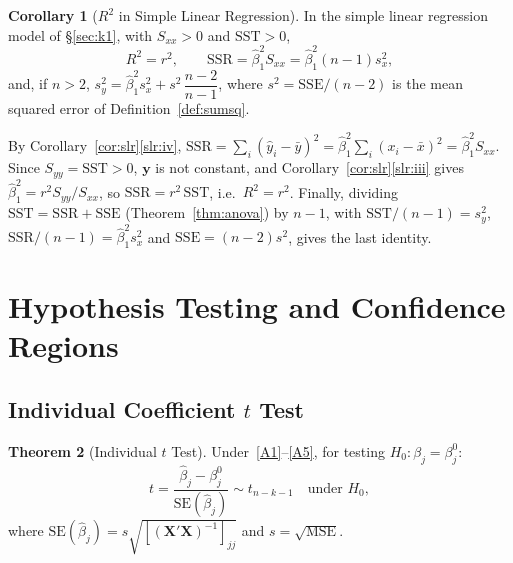 \documentclass[12pt,a4paper]{article}
\makeatletter
\theoremstyle{definition}
\newtheorem{theorem}{Theorem}[section]
\newtheorem{corollary}[theorem]{Corollary}
\renewenvironment{proof}[1][\proofname]{\par
  \pushQED{\qed}%
  \normalfont \topsep6\p@\@plus6\p@\relax
  \trivlist
  \item[\hskip\labelsep\bfseries #1\@addpunct{.}]\ignorespaces
}{%
  \popQED\endtrivlist\@endpefalse
}
\newcommand{\SST}{\mathrm{SST}}
\newcommand{\SSR}{\mathrm{SSR}}
\newcommand{\SSE}{\mathrm{SSE}}
\newcommand{\MSE}{\mathrm{MSE}}
\newcommand{\SE}{\mathrm{SE}}
\newcommand{\bX}{\mathbf{X}}
\newcommand{\by}{\mathbf{y}}
\makeatother
\begin{document}
\begin{corollary}[$R^2$ in Simple Linear Regression]\label{cor:R2-slr}
In the simple linear regression model of \S\ref{sec:k1}, with $S_{xx} > 0$ and $\SST > 0$,
\[
R^2 = r^2, \qquad \SSR = \hat\beta_1^2S_{xx} = \hat\beta_1^2(n-1)s_x^2,
\]
and, if $n > 2$, $s_y^2 = \hat\beta_1^2s_x^2 + s^2\,\dfrac{n-2}{n-1}$, where $s^2 = \SSE/(n-2)$ is the mean squared error of Definition~\ref{def:sumsq}.
\end{corollary}

\begin{proof}
By Corollary~\ref{cor:slr}\ref{slr:iv}, $\SSR = \sum_i(\hat y_i - \bar y)^2 = \hat\beta_1^2\sum_i(x_i - \bar x)^2 = \hat\beta_1^2S_{xx}$. Since $S_{yy} = \SST > 0$, $\by$ is not constant, and Corollary~\ref{cor:slr}\ref{slr:iii} gives $\hat\beta_1^2 = r^2S_{yy}/S_{xx}$, so $\SSR = r^2\,\SST$, i.e.\ $R^2 = r^2$. Finally, dividing $\SST = \SSR + \SSE$ (Theorem~\ref{thm:anova}) by $n - 1$, with $\SST/(n-1) = s_y^2$, $\SSR/(n-1) = \hat\beta_1^2s_x^2$ and $\SSE = (n-2)s^2$, gives the last identity.
\end{proof}

\section{Hypothesis Testing and Confidence Regions}\label{sec:test}

\subsection{Individual Coefficient \texorpdfstring{$t$}{t} Test}

\begin{theorem}[Individual $t$ Test]\label{thm:t-test}
Under~\ref{A1}--\ref{A5}, for testing $H_0\colon \beta_j = \beta_j^0$:
\begin{equation}
t = \frac{\hat{\beta}_j - \beta_j^0}{\SE(\hat{\beta}_j)} \sim t_{n-k-1} \quad \text{under } H_0,
\end{equation}
where $\SE(\hat{\beta}_j) = s\sqrt{[(\bX'\bX)^{-1}]_{jj}}$ and $s = \sqrt{\MSE}$.
\end{theorem}
\end{document}
